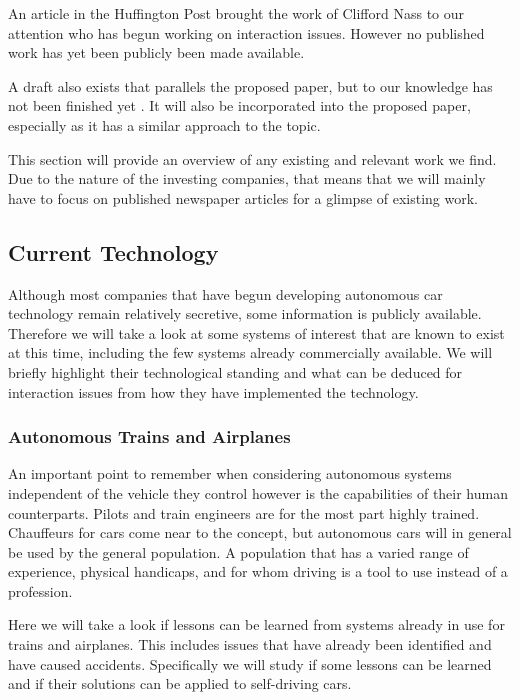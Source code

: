 \documentclass{acm_proc_article-sp}
\begin{document}
An article in the Huffington Post \cite{www:huffington_post} brought the work of Clifford Nass to our attention who has begun working on interaction issues.
However no published work has yet been publicly been made available.

A draft also exists that parallels the proposed paper, but to our knowledge has not been finished yet \cite{cummings:authority}.
It will also be incorporated into the proposed paper, especially as it has a similar approach to the topic.

This section will provide an overview of any existing and relevant work we find.
Due to the nature of the investing companies, that means that we will mainly have to focus on published newspaper articles for a glimpse of existing work.

\subsection{Current Technology}
\label{current_tech}

Although most companies that have begun developing autonomous car technology remain relatively secretive, some information is publicly available.
Therefore we will take a look at some systems of interest that are known to exist at this time, including the few systems already commercially available.
We will briefly highlight their technological standing and what can be deduced for interaction issues from how they have implemented the technology.

\subsubsection{Autonomous Trains and Airplanes}

An important point to remember when considering autonomous systems independent of the vehicle they control however is the capabilities of their human counterparts.
Pilots and train engineers are for the most part highly trained.
Chauffeurs for cars come near to the concept, but autonomous cars will in general be used by the general population.
A population that has a varied range of experience, physical handicaps, and for whom driving is a tool to use instead of a profession.

Here we will take a look if lessons can be learned from systems already in use for trains and airplanes.
This includes issues that have already been identified and have caused accidents.
Specifically we will study if some lessons can be learned and if their solutions can be applied to self-driving cars.
\end{document}
